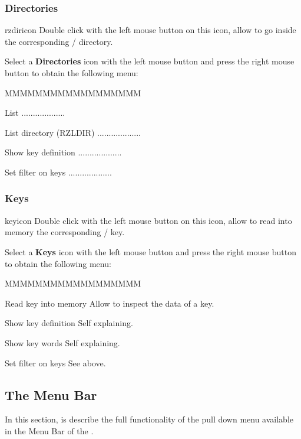 \subsubsection{\RZ{} Directories}
\begin{ICON}{rzdiricon}
Double click with the left mouse button on this icon, allow to go inside the
corresponding \ZEBRA/\RZ{} directory.
\end{ICON}

Select a {\bf \RZ{} Directories} icon with the left mouse button and press
the right mouse button to obtain the following menu:


\begin{DLsf}{MMMMMMMMMMMMMMMMMM}
\item[List]                      ...................
\item[List directory (RZLDIR)]   ...................
\item[Show key definition]       ...................
\item[Set filter on keys]        ...................
\end{DLsf}


\subsubsection{\RZ{} Keys}
\begin{ICON}{keyicon}
Double click with the left mouse button on this icon, allow to read into memory
the corresponding \ZEBRA/\RZ{} key.
\end{ICON}

Select a {\bf \RZ{} Keys} icon with the left mouse button and press
the right mouse button to obtain the following menu:


\begin{DLsf}{MMMMMMMMMMMMMMMMMM}
\item[Read key into memory] Allow to inspect the data of a key.
\item[Show key definition]  Self explaining.
\item[Show key words]       Self explaining.
\item[Set filter on keys]   See above.
\end{DLsf}


\subsection{The \MB{} Menu Bar}
In this section, is describe the full functionality of the pull down
menu available in the Menu Bar of the \MB.

